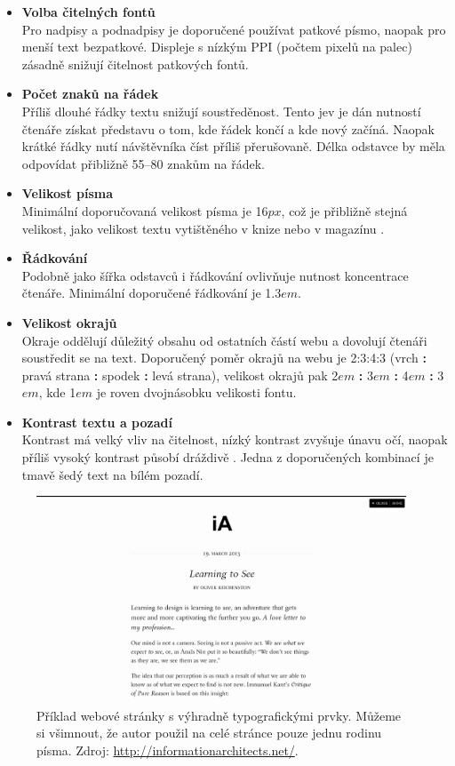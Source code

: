 \begin{itemize}
    \item \textbf{Volba čitelných fontů}\\
          Pro nadpisy a podnadpisy je doporučené používat patkové písmo, naopak pro menší text bezpatkové. Displeje s nízkým PPI (počtem pixelů na palec) zásadně snižují čitelnost patkových fontů.
    \item \textbf{Počet znaků na řádek}\\
          Příliš dlouhé řádky textu snižují soustředěnost. Tento jev je dán nutností čtenáře získat představu o tom, kde řádek končí a kde nový začíná. Naopak krátké řádky nutí návštěvníka číst příliš přerušovaně. Délka odstavce by měla odpovídat přibližně 55--80 znakům na řádek.
    \item \textbf{Velikost písma}\\
          Minimální doporučovaná velikost písma je 16$px$, což je přibližně stejná velikost, jako velikost textu vytištěného v knize nebo v magazínu \cite{min-font-size}.
    \item \textbf{Řádkování}\\
          Podobně jako šířka odstavců i řádkování ovlivňuje nutnost koncentrace čtenáře. Minimální doporučené řádkování je 1.3$em$.
    \item \textbf{Velikost okrajů}\\
          Okraje oddělují důležitý obsahu od ostatních částí webu a dovolují čtenáři soustředit se na text. Doporučený poměr okrajů na webu je 2:3:4:3 (vrch \textbf{:} pravá strana \textbf{:} spodek \textbf{:} levá strana), velikost okrajů pak 2$em$ \textbf{:} 3$em$ \textbf{:} 4$em$ \textbf{:} 3$em$, kde 1$em$ je roven dvojnásobku velikosti fontu.
    \item \textbf{Kontrast textu a pozadí}\\
          Kontrast má velký vliv na čitelnost, nízký kontrast zvyšuje únavu očí, naopak příliš vysoký kontrast působí dráždivě \cite{eye-strain}. Jedna z doporučených kombinací je tmavě šedý text na bílém pozadí.
\end{itemize}

\begin{figure}[htbp]
    \centering
    \includegraphics[width=11cm]{images/typography.png}
    \caption{Příklad webové stránky s výhradně typografickými prvky. Můžeme si všimnout, že autor použil na celé stránce pouze jednu rodinu písma. Zdroj: \url{http://informationarchitects.net/}.}
    \label{fig:web-typography}
\end{figure}

